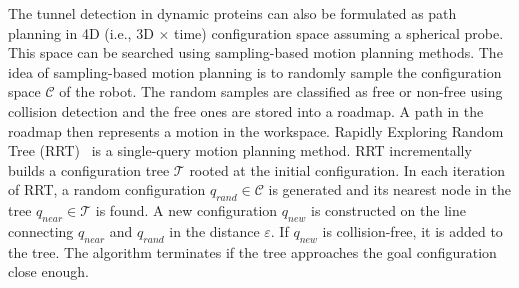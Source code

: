 \documentclass{llncs}
\def\qrand{q_{rand}}
\def\qnear{q_{near}}
\def\qnew{q_{new}}
\def\C{\mathcal{C}}
\def\T{\mathcal{T}}
\begin{document}
The tunnel detection in dynamic proteins can also be formulated as path planning in 4D (i.e., 3D $\times$ time) 
configuration space assuming a spherical probe.
This space can be searched using sampling-based motion planning methods.
The idea of sampling-based motion planning is to randomly sample the configuration space $\C$ of the robot. %
The random samples are classified as free or non-free using collision detection and  the free ones are stored into a roadmap.
A path in the roadmap then represents a motion in the workspace.
Rapidly Exploring Random Tree (RRT)~\cite{lavalleRRT} is a single-query motion planning method.
RRT incrementally builds a configuration tree $\T$ rooted at the initial configuration.
In each iteration of RRT, a random configuration $\qrand \in \C$ is generated and its nearest node in the tree $\qnear \in \T$ is found.
A new configuration $\qnew$ is constructed on the line connecting $\qnear$ and $\qrand$ in the distance $\varepsilon$.
If $\qnew$ is collision-free, it is added to the tree.
The algorithm terminates if the tree approaches the goal configuration close enough.
\end{document}
